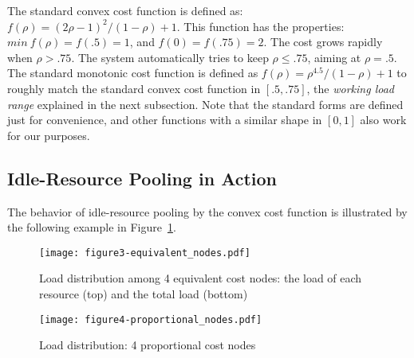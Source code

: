 The standard convex cost function is defined as:
$f(\rho) = (2\rho - 1)^{2}/(1 - \rho) + 1$.
This function has the properties:
$min\: f(\rho) = f(.5) = 1$, and $f(0) = f(.75) = 2$.
The cost grows rapidly when $\rho > .75$.
The system automatically tries to keep $\rho \le .75$,
aiming at $\rho = .5$.
The standard monotonic cost function is defined as
\( f(\rho) = \rho^{4.5}/(1 - \rho) + 1\)
to roughly match the standard convex cost function in $[.5, .75]$,
the {\em working load range} explained in the next subsection.
Note that the standard forms are defined just for convenience, and
other functions with a similar shape in $[0,1]$ also work for our
purposes.

\subsection{Idle-Resource Pooling in Action}

The behavior of idle-resource pooling by the convex cost function is
illustrated by the following example in Figure~\ref{fig:4node}.

\begin{figure}[tb]
  \begin{center}
    \texttt{[image: figure3-equivalent\_nodes.pdf]}
    \vspace{-5.0ex}
    \caption{Load distribution among 4 equivalent cost nodes:
      the load of each resource (top) and the total load (bottom)}
    \label{fig:4node}
  \end{center}
  \hspace{0.8\columnsep}
\end{figure}

\begin{figure}
  \begin{center}
    \texttt{[image: figure4-proportional\_nodes.pdf]}
    \vspace{-5.0ex}
    \caption{Load distribution: 4 proportional cost nodes}
    \label{fig:4node-ratio}
  \end{center}
\end{figure}

